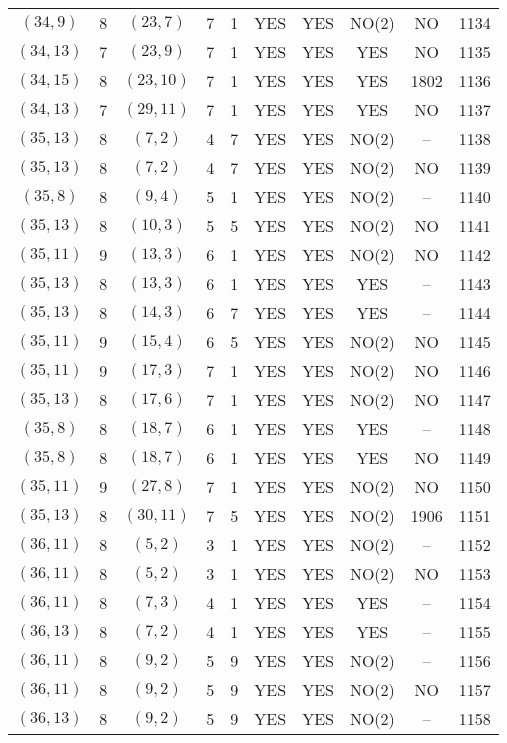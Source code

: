 \begin{longtable}{|c|c|c|c|c|c|c|c|c|c|}
$(34, 9)$ & 8 & $(23, 7)$ & 7 & 1 & YES & YES & NO(2) & NO & 1134\\
$(34, 13)$ & 7 & $(23, 9)$ & 7 & 1 & YES & YES & YES & NO & 1135\\
$(34, 15)$ & 8 & $(23, 10)$ & 7 & 1 & YES & YES & YES & 1802 & 1136\\
$(34, 13)$ & 7 & $(29, 11)$ & 7 & 1 & YES & YES & YES & NO & 1137\\
$(35, 13)$ & 8 & $(7, 2)$ & 4 & 7 & YES & YES & NO(2) & -- & 1138\\
$(35, 13)$ & 8 & $(7, 2)$ & 4 & 7 & YES & YES & NO(2) & NO & 1139\\
$(35, 8)$ & 8 & $(9, 4)$ & 5 & 1 & YES & YES & NO(2) & -- & 1140\\
$(35, 13)$ & 8 & $(10, 3)$ & 5 & 5 & YES & YES & NO(2) & NO & 1141\\
$(35, 11)$ & 9 & $(13, 3)$ & 6 & 1 & YES & YES & NO(2) & NO & 1142\\
$(35, 13)$ & 8 & $(13, 3)$ & 6 & 1 & YES & YES & YES & -- & 1143\\
$(35, 13)$ & 8 & $(14, 3)$ & 6 & 7 & YES & YES & YES & -- & 1144\\
$(35, 11)$ & 9 & $(15, 4)$ & 6 & 5 & YES & YES & NO(2) & NO & 1145\\
$(35, 11)$ & 9 & $(17, 3)$ & 7 & 1 & YES & YES & NO(2) & NO & 1146\\
$(35, 13)$ & 8 & $(17, 6)$ & 7 & 1 & YES & YES & NO(2) & NO & 1147\\
$(35, 8)$ & 8 & $(18, 7)$ & 6 & 1 & YES & YES & YES & -- & 1148\\
$(35, 8)$ & 8 & $(18, 7)$ & 6 & 1 & YES & YES & YES & NO & 1149\\
$(35, 11)$ & 9 & $(27, 8)$ & 7 & 1 & YES & YES & NO(2) & NO & 1150\\
$(35, 13)$ & 8 & $(30, 11)$ & 7 & 5 & YES & YES & NO(2) & 1906 & 1151\\
$(36, 11)$ & 8 & $(5, 2)$ & 3 & 1 & YES & YES & NO(2) & -- & 1152\\
$(36, 11)$ & 8 & $(5, 2)$ & 3 & 1 & YES & YES & NO(2) & NO & 1153\\
$(36, 11)$ & 8 & $(7, 3)$ & 4 & 1 & YES & YES & YES & -- & 1154\\
$(36, 13)$ & 8 & $(7, 2)$ & 4 & 1 & YES & YES & YES & -- & 1155\\
$(36, 11)$ & 8 & $(9, 2)$ & 5 & 9 & YES & YES & NO(2) & -- & 1156\\
$(36, 11)$ & 8 & $(9, 2)$ & 5 & 9 & YES & YES & NO(2) & NO & 1157\\
$(36, 13)$ & 8 & $(9, 2)$ & 5 & 9 & YES & YES & NO(2) & -- & 1158\\

\end{longtable}
